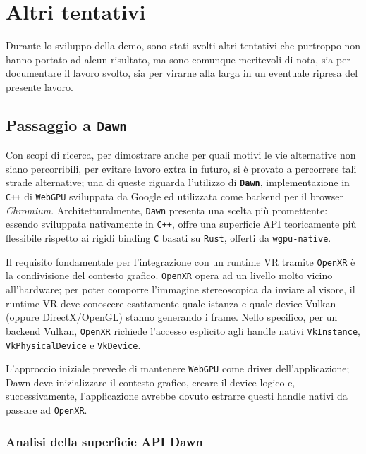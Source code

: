\documentclass[a4paper, 11pt, twoside]{report}
\begin{document}
\section{Altri tentativi}

Durante lo sviluppo della demo, sono stati svolti altri tentativi che purtroppo non hanno portato ad alcun risultato,
ma sono comunque meritevoli di nota, sia per documentare il lavoro svolto, sia per virarne alla larga in un eventuale
ripresa del presente lavoro.

\subsection{Passaggio a \texttt{Dawn}}

Con scopi di ricerca, per dimostrare anche per quali motivi le vie alternative non siano percorribili, per evitare
lavoro extra in futuro, si è provato a percorrere tali strade alternative; una di queste riguarda l'utilizzo
di \textbf{\texttt{Dawn}}, implementazione in \texttt{C++} di \texttt{WebGPU} sviluppata da Google ed utilizzata
come backend per il browser \textit{\gls{Chromium}}. Architetturalmente, \texttt{Dawn} presenta una scelta più
promettente:
essendo sviluppata nativamente in \texttt{C++}, offre una superficie API teoricamente più flessibile rispetto ai rigidi
binding \texttt{C} basati su \texttt{Rust}, offerti da \texttt{wgpu-native}.

Il requisito fondamentale per l'integrazione con un runtime VR tramite \texttt{\gls{OpenXR}} è la condivisione del
contesto grafico. \texttt{\gls{OpenXR}} opera ad un livello molto vicino all'hardware; per poter comporre l'immagine
stereoscopica da inviare al visore, il runtime VR deve conoscere esattamente quale istanza e quale device \gls{Vulkan}
(oppure \gls{DirectX}/OpenGL) stanno generando i frame. Nello specifico, per un backend \gls{Vulkan},
\texttt{\gls{OpenXR}} richiede l'accesso esplicito agli handle nativi \texttt{VkInstance}, \texttt{VkPhysicalDevice} e
\texttt{VkDevice}.

L'approccio iniziale prevede di mantenere \texttt{WebGPU} come driver dell'applicazione; Dawn deve inizializzare il
contesto grafico, creare il device logico e, successivamente, l'applicazione avrebbe dovuto estrarre questi handle
nativi da passare ad \texttt{\gls{OpenXR}}.

\subsubsection{Analisi della superficie API Dawn}
\end{document}
